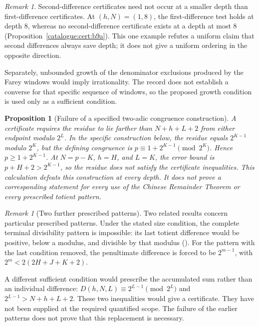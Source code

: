 \documentclass[11pt]{article}
\theoremstyle{plain}
\newtheorem{prop}[thm]{Proposition}
\theoremstyle{definition}
\theoremstyle{remark}
\newtheorem{rem}[thm]{Remark}
\newcommand{\lean}[2]{\leanlink{#2}}
\begin{document}
\begin{rem}
Second-difference certificates need not occur at a smaller depth than
first-difference certificates. At $(h,N)=(1,8)$, the first-difference test
holds at depth $8$, whereas no second-difference certificate exists at a
depth at most $8$ (Proposition~\ref{catalogue:cert:b9a}). This one
example refutes a uniform claim that second differences always save depth;
it does not give a uniform ordering in the opposite direction.

Separately, unbounded growth of the denominator exclusions produced by the
Farey windows would imply irrationality. The record does not establish a
converse for that specific sequence of windows, so the proposed growth
condition is used only as a sufficient condition.
\end{rem}

\begin{prop}[Failure of a specified two-adic congruence construction]
\label{prop:b4}
A certificate requires the residue to lie farther than $N+h+L+2$
from either endpoint modulo $2^L$. In the specific construction below,
the residue equals $2^{K-1}$ modulo $2^K$, but the defining
congruence is $p\equiv1+2^{K-1}\pmod{2^K}$. Hence
$p\ge1+2^{K-1}$. At $N=p-K$, $h=H$, and $L=K$, the error bound is
$p+H+2>2^{K-1}$, so the residue does not satisfy the certificate inequalities.
This calculation defeats this construction at every depth. It does not
prove a corresponding statement for every use of the Chinese Remainder
Theorem or every prescribed totient pattern.
\end{prop}

\begin{rem}[Two further prescribed patterns]
\label{rem:b4}
Two related results concern particular prescribed patterns. Under the
stated size condition, the complete terminal divisibility pattern is
impossible: its last totient difference would be positive, below a modulus,
and divisible by that modulus
(\lean{Erdos249257.DiagonalFreshLossBridge.PowerTwoOddWindowAffine.not_actualLcmTerminalDyadicStaircase_of_room}{TotientActualLcmTopEdgeStaircase.lean:251}).
For the pattern with the last condition
removed, the penultimate difference is forced to be $2^{m-1}$, with
$2^m<2(2H+J+K+2)$.

A different sufficient condition would prescribe the accumulated sum
rather than an individual difference:
${D}(h,N,L)\equiv2^{L-1}\pmod{2^L}$ and
$2^{L-1}>N+h+L+2$. These two inequalities would give a certificate.
They have not been supplied at the required quantified scope. The failure
of the earlier patterns does not prove that this replacement is necessary.
\end{rem}
\end{document}
